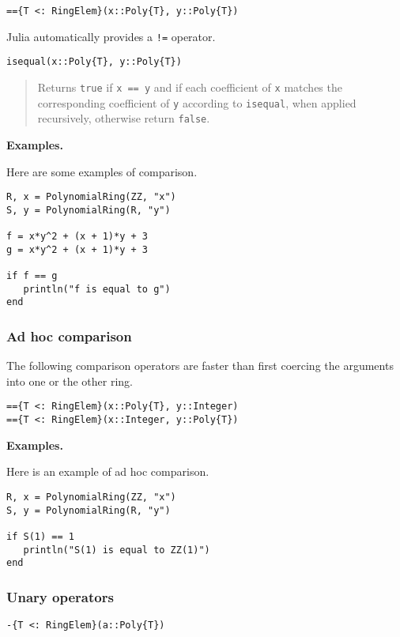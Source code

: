 \documentclass[a4paper,10pt]{article}
\newcommand{\code}{\lstinline}
\newcommand{\desc}[1]{\vspace{-3mm}\begin{quote}#1\end{quote}}
\begin{document}
\begin{lstlisting}
=={T <: RingElem}(x::Poly{T}, y::Poly{T})
\end{lstlisting}

Julia automatically provides a \code{!=} operator.

\begin{lstlisting}
isequal(x::Poly{T}, y::Poly{T})
\end{lstlisting}

\desc{Returns \code{true} if \code{x == y} and if each coefficient of \code{x}
matches the corresponding coefficient of \code{y} according to \code{isequal},
when applied recursively, otherwise return \code{false}.}

\textbf{Examples.}

Here are some examples of comparison.

\begin{lstlisting}
R, x = PolynomialRing(ZZ, "x")
S, y = PolynomialRing(R, "y")

f = x*y^2 + (x + 1)*y + 3
g = x*y^2 + (x + 1)*y + 3

if f == g
   println("f is equal to g")
end
\end{lstlisting}

\subsubsection{Ad hoc comparison}

The following comparison operators are faster than first coercing the arguments
into one or the other ring.

\begin{lstlisting}
=={T <: RingElem}(x::Poly{T}, y::Integer)
=={T <: RingElem}(x::Integer, y::Poly{T})
\end{lstlisting}

\textbf{Examples.}

Here is an example of ad hoc comparison.

\begin{lstlisting}
R, x = PolynomialRing(ZZ, "x")
S, y = PolynomialRing(R, "y")

if S(1) == 1
   println("S(1) is equal to ZZ(1)")
end
\end{lstlisting}

\subsubsection{Unary operators}

\begin{lstlisting}
-{T <: RingElem}(a::Poly{T})
\end{lstlisting}
\end{document}
